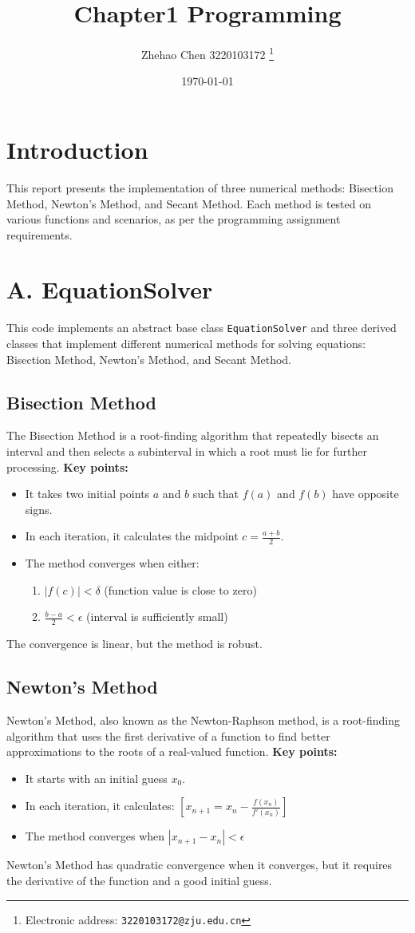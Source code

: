 \documentclass{article}
\title{\textbf{Chapter1 Programming}}
\author{Zhehao Chen 3220103172
  \thanks{Electronic address: \texttt{3220103172@zju.edu.cn}}}
\date{\today}
\begin{document}
\maketitle

\section{Introduction}
This report presents the implementation of three numerical methods: Bisection Method, Newton's Method, and Secant Method. Each method is tested on various functions and scenarios, as per the programming assignment requirements.

\section{A. EquationSolver}
This code implements an abstract base class \texttt{EquationSolver} and three derived classes that implement different numerical methods for solving equations: Bisection Method, Newton's Method, and Secant Method.
\subsection{Bisection Method}
The Bisection Method is a root-finding algorithm that repeatedly bisects an interval and then selects a subinterval in which a root must lie for further processing.
\textbf{Key points:}
\begin{itemize}
\item It takes two initial points $a$ and $b$ such that $f(a)$ and $f(b)$ have opposite signs.
\item In each iteration, it calculates the midpoint $c = \frac{a + b}{2}$.
\item The method converges when either:
\begin{enumerate}
\item $|f(c)| < \delta$ (function value is close to zero)
\item $\frac{b - a}{2} < \epsilon$ (interval is sufficiently small)
\end{enumerate}
\end{itemize}
The convergence is linear, but the method is robust.
\subsection{Newton's Method}
Newton's Method, also known as the Newton-Raphson method, is a root-finding algorithm that uses the first derivative of a function to find better approximations to the roots of a real-valued function.
\textbf{Key points:}
\begin{itemize}
\item It starts with an initial guess $x_0$.
\item In each iteration, it calculates:
$[ x_{n+1} = x_n - \frac{f(x_n)}{f'(x_n)} ]$
\item The method converges when $|x_{n+1} - x_n| < \epsilon$
\end{itemize}
Newton's Method has quadratic convergence when it converges, but it requires the derivative of the function and a good initial guess.
\end{document}
